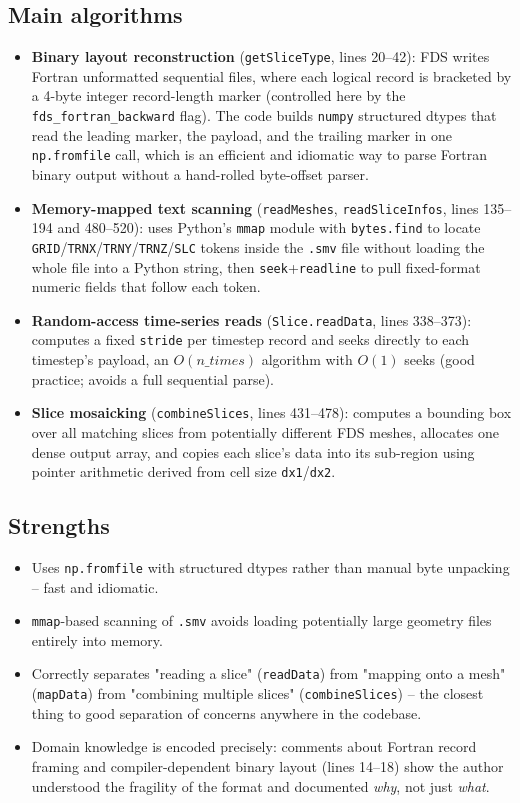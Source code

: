 \documentclass[11pt,a4paper]{report}
\begin{document}
\subsection{Main algorithms}
\begin{itemize}
\item \textbf{Binary layout reconstruction} (\texttt{getSliceType}, lines 20--42): FDS writes
Fortran unformatted sequential files, where each logical record is bracketed by a 4-byte integer
record-length marker (controlled here by the \texttt{fds\_fortran\_backward} flag). The code builds
\texttt{numpy} structured dtypes that read the leading marker, the payload, and the trailing marker in
one \texttt{np.fromfile} call, which is an efficient and idiomatic way to parse Fortran binary output
without a hand-rolled byte-offset parser.
\item \textbf{Memory-mapped text scanning} (\texttt{readMeshes}, \texttt{readSliceInfos}, lines
135--194 and 480--520): uses Python's \texttt{mmap} module with \texttt{bytes.find} to locate
\texttt{GRID}/\texttt{TRNX}/\texttt{TRNY}/\texttt{TRNZ}/\texttt{SLC} tokens inside the \texttt{.smv}
file without loading the whole file into a Python string, then \texttt{seek}+\texttt{readline} to pull
fixed-format numeric fields that follow each token.
\item \textbf{Random-access time-series reads} (\texttt{Slice.readData}, lines 338--373): computes a
fixed \texttt{stride} per timestep record and seeks directly to each timestep's payload, an
$O(n\_times)$ algorithm with $O(1)$ seeks (good practice; avoids a full sequential parse).
\item \textbf{Slice mosaicking} (\texttt{combineSlices}, lines 431--478): computes a bounding box over
all matching slices from potentially different FDS meshes, allocates one dense output array, and
copies each slice's data into its sub-region using pointer arithmetic derived from cell size
\texttt{dx1}/\texttt{dx2}.
\end{itemize}

\subsection{Strengths}
\begin{itemize}[nosep]
\item Uses \texttt{np.fromfile} with structured dtypes rather than manual byte unpacking -- fast and
idiomatic.
\item \texttt{mmap}-based scanning of \texttt{.smv} avoids loading potentially large geometry files
entirely into memory.
\item Correctly separates "reading a slice" (\texttt{readData}) from "mapping onto a mesh"
(\texttt{mapData}) from "combining multiple slices" (\texttt{combineSlices}) -- the closest thing to
good separation of concerns anywhere in the codebase.
\item Domain knowledge is encoded precisely: comments about Fortran record framing and
compiler-dependent binary layout (lines 14--18) show the author understood the fragility of the
format and documented \emph{why}, not just \emph{what}.
\end{itemize}
\end{document}
